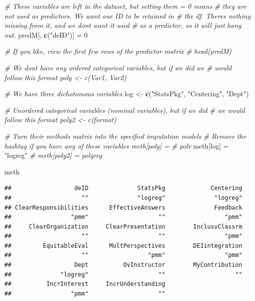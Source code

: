 \documentclass[
  11pt,
]{book}
\newenvironment{Shaded}{\begin{snugshade}}{\end{snugshade}}
\newcommand{\CommentTok}[1]{\textcolor[rgb]{0.37,0.37,0.37}{\textit{#1}}}
\newcommand{\DecValTok}[1]{\textcolor[rgb]{0.06,0.06,0.06}{#1}}
\newcommand{\FunctionTok}[1]{\textcolor[rgb]{0.27,0.27,0.27}{\textbf{#1}}}
\newcommand{\NormalTok}[1]{#1}
\newcommand{\OtherTok}[1]{\textcolor[rgb]{0.37,0.37,0.37}{#1}}
\newcommand{\StringTok}[1]{\textcolor[rgb]{0.5,0.5,0.5}{#1}}
\begin{document}
\begin{Shaded}
\begin{Highlighting}[]
\CommentTok{\# These variables are left in the dataset, but setting them = 0 means}
\CommentTok{\# they are not used as predictors.  We want our ID to be retained in}
\CommentTok{\# the df.  There\textquotesingle{}s nothing missing from it, and we don\textquotesingle{}t want it used}
\CommentTok{\# as a predictor, so it will just hang out.}
\NormalTok{predM[, }\FunctionTok{c}\NormalTok{(}\StringTok{"deID"}\NormalTok{)] }\OtherTok{=} \DecValTok{0}

\CommentTok{\# If you like, view the first few rows of the predictor matrix}
\CommentTok{\# head(predM)}

\CommentTok{\# We don\textquotesingle{}t have any ordered categorical variables, but if we did we}
\CommentTok{\# would follow this format poly \textless{}{-} c(\textquotesingle{}Var1\textquotesingle{}, \textquotesingle{}Var2\textquotesingle{})}

\CommentTok{\# We have three dichotomous variables}
\NormalTok{log }\OtherTok{\textless{}{-}} \FunctionTok{c}\NormalTok{(}\StringTok{"StatsPkg"}\NormalTok{, }\StringTok{"Centering"}\NormalTok{, }\StringTok{"Dept"}\NormalTok{)}

\CommentTok{\# Unordered categorical variables (nominal variables), but if we did}
\CommentTok{\# we would follow this format poly2 \textless{}{-} c(\textquotesingle{}format\textquotesingle{})}

\CommentTok{\# Turn their methods matrix into the specified imputation models}
\CommentTok{\# Remove the hashtag if you have any of these variables meth[poly] =}
\CommentTok{\# \textquotesingle{}polr\textquotesingle{}}
\NormalTok{meth[log] }\OtherTok{=} \StringTok{"logreg"}
\CommentTok{\# meth[poly2] = \textquotesingle{}polyreg\textquotesingle{}}

\NormalTok{meth}
\end{Highlighting}
\end{Shaded}

\begin{verbatim}
##                  deID              StatsPkg             Centering 
##                    ""              "logreg"              "logreg" 
## ClearResponsibilities      EffectiveAnswers              Feedback 
##                 "pmm"                    ""                 "pmm" 
##     ClearOrganization     ClearPresentation        InclusvClassrm 
##                    ""                    ""                 "pmm" 
##         EquitableEval      MultPerspectives        DEIintegration 
##                    ""                 "pmm"                 "pmm" 
##                  Dept          OvInstructor        MyContribution 
##              "logreg"                    ""                    "" 
##          IncrInterest     IncrUnderstanding 
##                 "pmm"                    ""
\end{verbatim}
\end{document}
